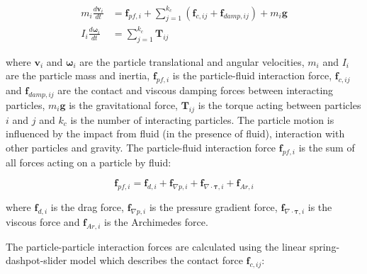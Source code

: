 \documentclass{article}
\begin{document}

\begin{align}
m_i\frac{d \bm{v}_i}{dt} &= \bm{f}_{pf,i} +\sum_{j=1}^{k_c} \left( \bm{f}_{c,ij} + \bm{f}_{damp,ij} \right) +m_i \bm {g}\label{eq:1} \\
I_i\frac{d \bm{\omega}_i}{dt} &= \sum_{j=1}^{k_c} \bm{T}_{ij} \label{eq:2}
\end{align}

where $\bm{v}_i$ and $\bm{\omega}_i$ are the particle translational and angular velocities, $m_i$ and $I_i$ are the particle mass and inertia, $\bm{f}_{pf,i}$ is the particle-fluid interaction force,  $\bm{f}_{c,ij}$ and $\bm{f}_{damp,ij}$ are the contact and viscous damping forces between interacting particles, $m_i \bm g $ is the gravitational force, $\bm{T}_{ij}$ is the torque acting between particles $i$ and $j$ and $k_c$ is the number of interacting particles. The particle motion is influenced by the impact from fluid (in the presence of fluid), interaction with other particles and gravity. The particle-fluid interaction force  $\bm{f}_{pf,i}$ is the sum of all forces acting on a particle by fluid: 

\begin{equation}
\bm{f}_{pf, i} = \bm{f}_{d, i} + \bm{f}_{\nabla p, i} + \bm{f}_{\nabla \cdot \bm {\tau}, i} + \bm{f}_{Ar, i} \label{eq:2b}
\end{equation}


where $ \bm f_{d,i}$ is the drag force, $  \bm f_{\nabla p,i}$ is the pressure gradient force, $ \bm f_{\nabla \cdot \bm{\tau},i}$ is the viscous force and $ \bm f_{Ar, i}$ is the Archimedes force.


The particle-particle interaction forces are calculated using the linear spring-dashpot-slider model \citep{cundall1979discrete} which describes the contact force $\bm{f}_{c,ij}$: 
\end{document}
